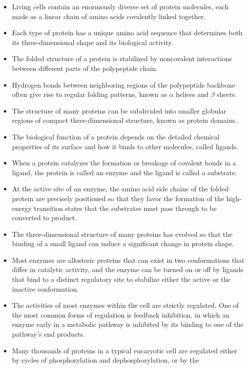 \begin{itemize}
\item Living cells contain an enormously diverse set of protein molecules,
each made as a linear chain of amino acids covalently linked
together.
\item Each type of protein has a unique amino acid sequence that determines
both its three-dimensional shape and its biological activity.
\item The folded structure of a protein is stabilized by noncovalent interactions
between different parts of the polypeptide chain.
\item Hydrogen bonds between neighboring regions of the polypeptide
backbone often give rise to regular folding patterns, known as $\alpha$ helices and $\beta$ sheets.
\item The structure of many proteins can be subdivided into smaller globular
regions of compact three-dimensional structure, known as protein
domains.
\item The biological function of a protein depends on the detailed chemical
properties of its surface and how it binds to other molecules, called
ligands.
\item When a protein catalyzes the formation or breakage of covalent
bonds in a ligand, the protein is called an enzyme and the ligand is
called a substrate.
\item At the active site of an enzyme, the amino acid side chains of the
folded protein are precisely positioned so that they favor the formation
of the high-energy transition states that the substrates must
pass through to be converted to product.
\item The three-dimensional structure of many proteins has evolved so
that the binding of a small ligand can induce a significant change in
protein shape.
\item Most enzymes are allosteric proteins that can exist in two conformations
that differ in catalytic activity, and the enzyme can be turned
on or off by ligands that bind to a distinct regulatory site to stabilize
either the active or the inactive conformation.
\item The activities of most enzymes within the cell are strictly regulated.
One of the most common forms of regulation is feedback inhibition,
in which an enzyme early in a metabolic pathway is inhibited by its
binding to one of the pathway’s end products.
\item Many thousands of proteins in a typical eucaryotic cell are regulated
either by cycles of phosphorylation and dephosphorylation, or by the

\end{itemize}
